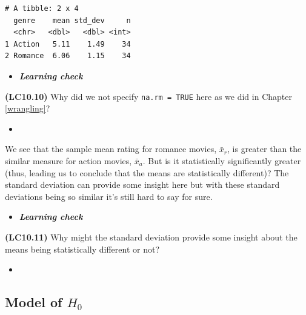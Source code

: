 \documentclass[12pt, krantz2,]{krantz}
\makeatletter
\newenvironment{Shaded}{\begin{snugshade}}{\end{snugshade}}
\newcommand{\DataTypeTok}[1]{\textcolor[rgb]{0.27,0.27,0.27}{#1}}
\newcommand{\KeywordTok}[1]{\textcolor[rgb]{0.27,0.27,0.27}{\textbf{#1}}}
\newcommand{\NormalTok}[1]{#1}
\newcommand{\OperatorTok}[1]{\textcolor[rgb]{0.43,0.43,0.43}{\textbf{#1}}}
\newcommand{\StringTok}[1]{\textcolor[rgb]{0.5,0.5,0.5}{#1}}
\newenvironment{kframe}{%
\medskip{}
\setlength{\fboxsep}{.8em}
 \def\at@end@of@kframe{}%
 \ifinner\ifhmode%
  \def\at@end@of@kframe{\end{minipage}}%
  \begin{minipage}{\columnwidth}%
 \fi\fi%
 \def\FrameCommand##1{\hskip\@totalleftmargin \hskip-\fboxsep
 \colorbox{shadecolor}{##1}\hskip-\fboxsep
     \hskip-\linewidth \hskip-\@totalleftmargin \hskip\columnwidth}%
 \MakeFramed {\advance\hsize-\width
   \@totalleftmargin\z@ \linewidth\hsize
   \@setminipage}}%
 {\par\unskip\endMakeFramed%
 \at@end@of@kframe}
\renewenvironment{Shaded}{\begin{kframe}}{\end{kframe}}
\newenvironment{rmdblock}[1]
  {\begin{shaded*}
  \begin{itemize}
  \renewcommand{\labelitemi}{
    \raisebox{-.7\height}[0pt][0pt]{
    }
  }
  \item
  }
  {
  \end{itemize}
  \end{shaded*}
  }
\newenvironment{learncheck}
  {\begin{rmdblock}{warning}}
  {\end{rmdblock}}
\makeatother
\begin{document}
\begin{Shaded}
\end{Shaded}

\begin{verbatim}
# A tibble: 2 x 4
  genre    mean std_dev     n
  <chr>   <dbl>   <dbl> <int>
1 Action   5.11    1.49    34
2 Romance  6.06    1.15    34
\end{verbatim}

\begin{learncheck}
\textbf{\emph{Learning check}}
\end{learncheck}

\textbf{(LC10.10)} Why did we not specify \texttt{na.rm\ =\ TRUE} here as we did in Chapter \ref{wrangling}?

\begin{learncheck}

\end{learncheck}

We see that the sample mean rating for romance movies, \(\bar{x}_{r}\), is greater than the similar measure for action movies, \(\bar{x}_a\). But is it statistically significantly greater (thus, leading us to conclude that the means are statistically different)? The standard deviation can provide some insight here but with these standard deviations being so similar it's still hard to say for sure.

\begin{learncheck}
\textbf{\emph{Learning check}}
\end{learncheck}

\textbf{(LC10.11)} Why might the standard deviation provide some insight about the means being statistically different or not?

\begin{learncheck}

\end{learncheck}

\hypertarget{model-of-h_0}{%
\subsection{\texorpdfstring{Model of \(H_0\)}{Model of H\_0}}\label{model-of-h_0}}
\end{document}
